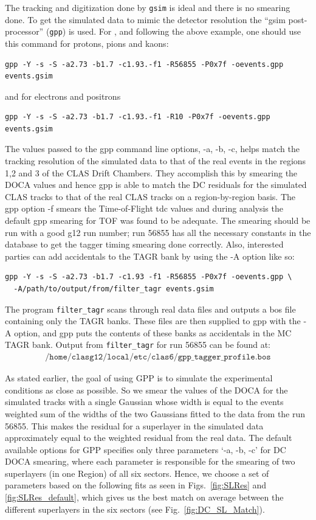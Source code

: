 The tracking and digitization done by \texttt{gsim} is ideal and there is no smearing done. To get the simulated data to mimic the detector resolution the ``gsim post-processor'' (\texttt{gpp}) is used. For , and following the above example, one should use this command for protons, pions and kaons:
\begin{verbatim}
gpp -Y -s -S -a2.73 -b1.7 -c1.93.-f1 -R56855 -P0x7f -oevents.gpp events.gsim
\end{verbatim}
and for electrons and positrons
\begin{verbatim}
gpp -Y -s -S -a2.73 -b1.7 -c1.93.-f1 -R10 -P0x7f -oevents.gpp events.gsim
\end{verbatim}
The values passed to the gpp command line options, -a, -b, -c, helps match the tracking resolution of the simulated data to that of the real events in the regions 1,2 and 3 of the CLAS Drift Chambers. They accomplish this by smearing the DOCA values and hence gpp is able to match the DC residuals for the simulated CLAS tracks to that of the real CLAS tracks on a region-by-region basis. The gpp option -f smears the Time-of-Flight tdc values and during analysis the default gpp smearing for TOF was found to be adequate. The smearing should be run with a good g12 run number; run 56855 has all the necessary constants in the database to get the tagger timing smearing done correctly. Also, interested parties can add accidentals to the TAGR bank by using the -A option like so:
\begin{verbatim}
gpp -Y -s -S -a2.73 -b1.7 -c1.93 -f1 -R56855 -P0x7f -oevents.gpp \
  -A/path/to/output/from/filter_tagr events.gsim
\end{verbatim}
The program \texttt{filter\_tagr} scans through real data files and outputs a bos file containing only the TAGR banks. These files are then supplied to gpp with the -A option, and gpp puts the contents of these banks as accidentals in the MC TAGR bank. Output from \texttt{filter\_tagr} for run 56855 can be found at:
\begin{align}
    \texttt{/home/clasg12/local/etc/clas6/gpp\_tagger\_profile.bos} \nonumber
\end{align}


As stated earlier, the goal of using GPP is to simulate the experimental conditions as close as possible. So we smear the values of the DOCA for the simulated tracks with a single Gaussian whose width is equal to the events weighted sum of the widths of the two Gaussians fitted to the data from the run 56855. This makes the residual for a superlayer in the simulated data approximately equal to the weighted residual from the real data. The default available options for GPP specifies only three parameters `-a, -b, -c' for DC DOCA smearing, where each parameter is responsible for the smearing of two superlayers (in one Region) of all six sectors. Hence, we choose a set of parameters based on the following fits as seen in Figs.~\ref{fig:SLRes} and \ref{fig:SLRes_default}, which gives us the best match on average between the different superlayers in the six sectors (see Fig.~\ref{fig:DC_SL_Match}).

